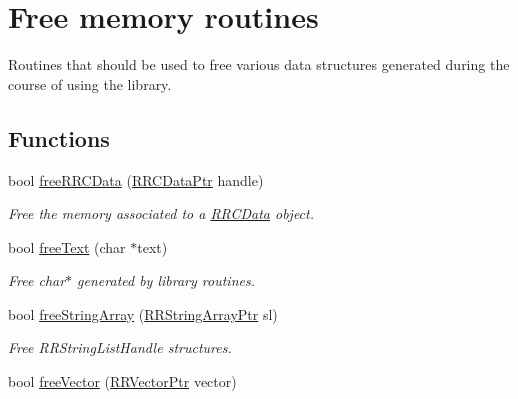 \hypertarget{group__free_routines}{\section{Free memory routines}
\label{group__free_routines}
}


Routines that should be used to free various data structures generated during the course of using the library.  


\subsection*{Functions}
\begin{DoxyCompactItemize}
\item 
\hypertarget{group__free_routines_ga96317bb0c9ad3daee01c9665cc14b223}{bool \hyperlink{group__free_routines_ga96317bb0c9ad3daee01c9665cc14b223}{free\-R\-R\-C\-Data} (\hyperlink{rrc__types_8h_a9da8b124eb9c3c0045f8926c6a420b4a}{R\-R\-C\-Data\-Ptr} handle)}\label{group__free_routines_ga96317bb0c9ad3daee01c9665cc14b223}

\begin{DoxyCompactList}\small\item\em Free the memory associated to a \hyperlink{struct_r_r_c_data}{R\-R\-C\-Data} object. \end{DoxyCompactList}\item 
\hypertarget{group__free_routines_gab2e32a8a1058720ae1912a67f5bdc269}{bool \hyperlink{group__free_routines_gab2e32a8a1058720ae1912a67f5bdc269}{free\-Text} (char $\ast$text)}\label{group__free_routines_gab2e32a8a1058720ae1912a67f5bdc269}

\begin{DoxyCompactList}\small\item\em Free char$\ast$ generated by library routines. \end{DoxyCompactList}\item 
bool \hyperlink{group__free_routines_ga1063c18523547aa3339347d9fc8cd6e0}{free\-String\-Array} (\hyperlink{rrc__types_8h_a7c9475df6c7337d99482b13a365e7596}{R\-R\-String\-Array\-Ptr} sl)
\begin{DoxyCompactList}\small\item\em Free R\-R\-String\-List\-Handle structures. \end{DoxyCompactList}\item 
\hypertarget{group__free_routines_ga8a8e57e9c2ec5d906c931d7a90b4ce18}{bool \hyperlink{group__free_routines_ga8a8e57e9c2ec5d906c931d7a90b4ce18}{free\-Vector} (\hyperlink{rrc__types_8h_a3be72d6006034fd349f753d2bf441bf7}{R\-R\-Vector\-Ptr} vector)}\label{group__free_routines_ga8a8e57e9c2ec5d906c931d7a90b4ce18}


\end{DoxyCompactItemize}
